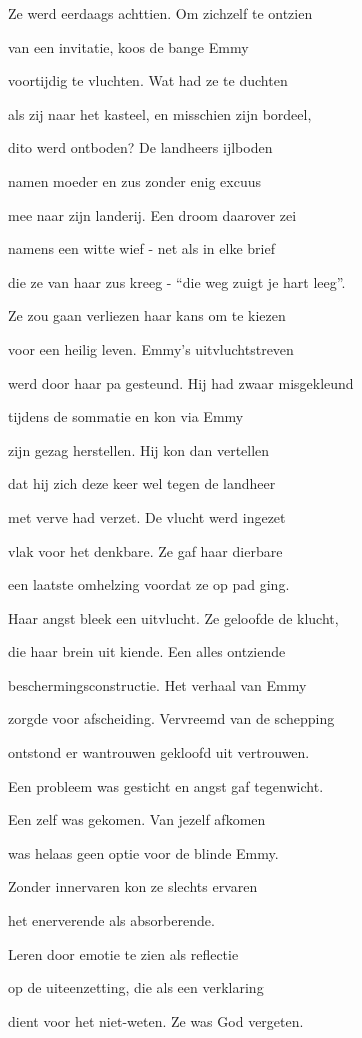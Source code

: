 Ze werd eerdaags achttien.
Om zichzelf te ontzien

van een invitatie,
koos de bange Emmy

voortijdig te vluchten.
Wat had ze te duchten

als zij naar het kasteel,
en misschien zijn bordeel,

dito werd ontboden?
De landheers ijlboden

namen moeder en zus
zonder enig excuus

mee naar zijn landerij.
Een droom daarover zei

namens een witte wief -
net als in elke brief

die ze van haar zus kreeg -
“die weg zuigt je hart leeg”.

Ze zou gaan verliezen
haar kans om te kiezen

voor een heilig leven.
Emmy’s uitvluchtstreven

werd door haar pa gesteund.
Hij had zwaar misgekleund

tijdens de sommatie
en kon via Emmy

zijn gezag herstellen.
Hij kon dan vertellen

dat hij zich deze keer
wel tegen de landheer

met verve had verzet.
De vlucht werd ingezet

vlak voor het denkbare.
Ze gaf haar dierbare

een laatste omhelzing
voordat ze op pad ging.

Haar angst bleek een uitvlucht.
Ze geloofde de klucht,

die haar brein uit kiende.
Een alles ontziende

beschermingsconstructie.
Het verhaal van Emmy

zorgde voor afscheiding.
Vervreemd van de schepping

ontstond er wantrouwen
gekloofd uit vertrouwen.

Een probleem was gesticht
en angst gaf tegenwicht.

Een zelf was gekomen.
Van jezelf afkomen

was helaas geen optie
voor de blinde Emmy.

Zonder innervaren
kon ze slechts ervaren

het enerverende
als absorberende.

Leren door emotie
te zien als reflectie

op de uiteenzetting,
die als een verklaring

dient voor het niet-weten.
Ze was God vergeten.

